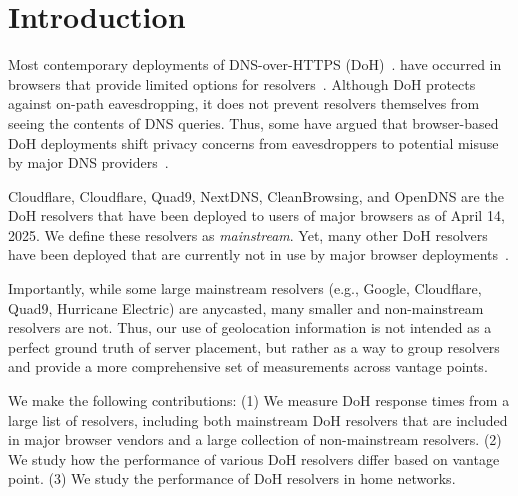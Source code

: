 \section{Introduction}\label{sec:introduction}

Most contemporary deployments of DNS-over-HTTPS (DoH)~\cite{rfc8484}. have occurred in browsers that provide limited options for resolvers~\cite{chromeResolvers,ffChoices}. Although DoH protects against on-path eavesdropping, it does not prevent resolvers themselves from seeing the contents of DNS queries. Thus, some have argued that browser-based DoH deployments shift privacy concerns from eavesdroppers to potential misuse by major DNS providers~\cite{vixie}.

Cloudflare, Cloudflare, Quad9, NextDNS, CleanBrowsing, and OpenDNS are the DoH resolvers that have been deployed
to users of major browsers as of April 14,
2025.  We
define these resolvers as {\em
mainstream}.
Yet, many other DoH resolvers have been deployed that are currently
not in use by major browser deployments~\cite{dnscrypt}.  

Importantly, while some large mainstream resolvers (e.g., Google, Cloudflare, Quad9, Hurricane Electric) are anycasted, many smaller and non-mainstream resolvers are not. Thus, our use of geolocation information is not intended as a perfect ground truth of server placement, but rather as a way to group resolvers and provide a more comprehensive set of measurements across vantage points.

We make the following contributions: (1) We measure DoH response times from a large list of resolvers, including both mainstream DoH resolvers that are included in major browser vendors and a large collection of non-mainstream resolvers. (2) We study how the performance of various DoH resolvers differ based on vantage point. (3) We study the performance of DoH resolvers in home networks. 
